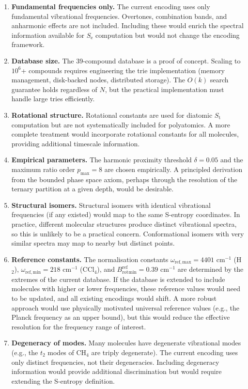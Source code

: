 \documentclass[11pt,a4paper]{article}
\theoremstyle{definition}
\theoremstyle{remark}
\newcommand{\St}{S_{\mathrm{t}}}
\newcommand{\Se}{S_{\mathrm{e}}}
\newcommand{\Brot}{B_{\mathrm{rot}}}
\begin{document}
\begin{enumerate}
\item \textbf{Fundamental frequencies only.} The current encoding uses only fundamental vibrational frequencies. Overtones, combination bands, and anharmonic effects are not included. Including these would enrich the spectral information available for $\Se$ computation but would not change the encoding framework.

\item \textbf{Database size.} The 39-compound database is a proof of concept. Scaling to $10^6$+ compounds requires engineering the trie implementation (memory management, disk-backed nodes, distributed storage). The $O(k)$ search guarantee holds regardless of $N$, but the practical implementation must handle large tries efficiently.

\item \textbf{Rotational structure.} Rotational constants are used for diatomic $\St$ computation but are not systematically included for polyatomics. A more complete treatment would incorporate rotational constants for all molecules, providing additional timescale information.

\item \textbf{Empirical parameters.} The harmonic proximity threshold $\delta = 0.05$ and the maximum ratio order $p_{\max} = 8$ are chosen empirically. A principled derivation from the bounded phase space axiom, perhaps through the resolution of the ternary partition at a given depth, would be desirable.

\item \textbf{Structural isomers.} Structural isomers with identical vibrational frequencies (if any existed) would map to the same S-entropy coordinates. In practice, different molecular structures produce distinct vibrational spectra, so this is unlikely to be a practical concern. Conformational isomers with very similar spectra may map to nearby but distinct points.

\item \textbf{Reference constants.} The normalisation constants $\omega_{\mathrm{ref,max}} = 4401$ cm$^{-1}$ (H$_2$), $\omega_{\mathrm{ref,min}} = 218$ cm$^{-1}$ (CCl$_4$), and $\Brot^{\mathrm{ref}}_{\mathrm{min}} = 0.39$ cm$^{-1}$ are determined by the extremes of the current database. If the database is extended to include molecules with higher or lower frequencies, these reference values would need to be updated, and all existing encodings would shift. A more robust approach would use physically motivated universal reference values (e.g., the Planck frequency as an upper bound), but this would reduce the effective resolution for the frequency range of interest.

\item \textbf{Degeneracy of modes.} Many molecules have degenerate vibrational modes (e.g., the $t_2$ modes of CH$_4$ are triply degenerate). The current encoding uses only distinct frequencies, not their degeneracies. Including degeneracy information would provide additional discrimination but would require extending the S-entropy definition.
\end{enumerate}
\end{document}

